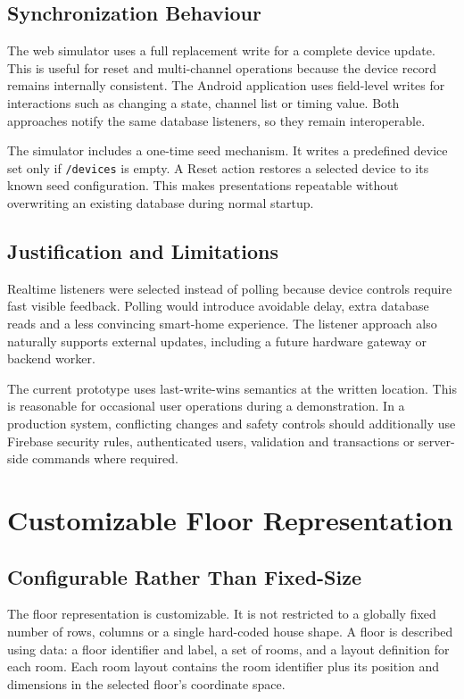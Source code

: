 \documentclass[11pt,a4paper]{article}
\begin{document}
\subsection{Synchronization Behaviour}
The web simulator uses a full replacement write for a complete device update. This is useful for reset and multi-channel operations because the device record remains internally consistent. The Android application uses field-level writes for interactions such as changing a state, channel list or timing value. Both approaches notify the same database listeners, so they remain interoperable.

The simulator includes a one-time seed mechanism. It writes a predefined device set only if \texttt{/devices} is empty. A Reset action restores a selected device to its known seed configuration. This makes presentations repeatable without overwriting an existing database during normal startup.

\subsection{Justification and Limitations}
Realtime listeners were selected instead of polling because device controls require fast visible feedback. Polling would introduce avoidable delay, extra database reads and a less convincing smart-home experience. The listener approach also naturally supports external updates, including a future hardware gateway or backend worker.

The current prototype uses last-write-wins semantics at the written location. This is reasonable for occasional user operations during a demonstration. In a production system, conflicting changes and safety controls should additionally use Firebase security rules, authenticated users, validation and transactions or server-side commands where required.

\newpage
\section{Customizable Floor Representation}
\subsection{Configurable Rather Than Fixed-Size}
The floor representation is customizable. It is not restricted to a globally fixed number of rows, columns or a single hard-coded house shape. A floor is described using data: a floor identifier and label, a set of rooms, and a layout definition for each room. Each room layout contains the room identifier plus its position and dimensions in the selected floor's coordinate space.
\end{document}
